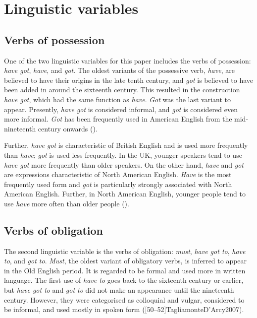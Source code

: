 \documentclass[output=paper,colorlinks,citecolor=brown]{langscibook}
\begin{document}
\section{Linguistic variables} \label{sec:hirano:3}%
\subsection{Verbs of possession} %
\label{sec:hirano:3.1}

One of the two linguistic variables for this paper includes the verbs of possession: \textit{have got}, \textit{have}, and \textit{got}. The oldest variants of the possessive verb, \textit{have}, are believed to have their origins in the late tenth century, and \textit{got} is believed to have been added in around the sixteenth century. This resulted in the construction \textit{have got}, which had the same function as \textit{have}. \textit{Got} was the last variant to appear. Presently, \textit{have got} is considered informal, and \textit{got} is considered even more informal. \textit{Got} has been frequently used in American English from the mid-nineteenth century onwards (\cites[207--208]{Kroch1989}[489]{Lorenz2016}[532--534]{Tagliamonte2003}[146--147]{Tagliamonte2013a}[141--142]{Tagliamonte2013b}).

Further, \textit{have got} is characteristic of British English and is used more frequently than \textit{have}; \textit{got} is used less frequently. In the UK, younger speakers tend to use \textit{have got} more frequently than older speakers. On the other hand, \textit{have} and \textit{got} are expressions characteristic of North American English. \textit{Have} is the most frequently used form and \textit{got} is particularly strongly associated with North American English. Further, in North American English, younger people tend to use \textit{have} more often than older people (\cites[25--29]{Jankowski2016}[207--208]{Kroch1989}[146--147]{Tagliamonte2013a}[141--142]{Tagliamonte2013b}[157--160]{TagliamonteEtAl2010}).

\subsection{Verbs of obligation} %
\label{sec:hirano:3.2}

The second linguistic variable is the verbs of obligation: \textit{must}, \textit{have got to}, \textit{have to}, and \textit{got to}. \textit{Must}, the oldest variant of obligatory verbs, is inferred to appear in the Old English period. It is regarded to be formal and used more in written language. The first use of \textit{have to} goes back to the sixteenth century or earlier, but \textit{have got to} and \textit{got to} did not make an appearance until the nineteenth century. However, they were categorised as colloquial and vulgar, considered to be informal, and used mostly in spoken form (\cites[135--136]{Tagliamonte2013a}[142]{Tagliamonte2013b}[50--52]{TagliamonteD’Arcy2007}).
\end{document}
